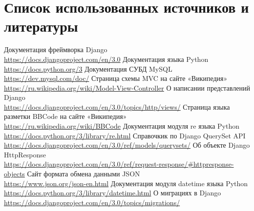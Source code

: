 \documentclass[12pt, a4paper, oneside]{article}
\begin{document}
\section{Список использованных источников и литературы}
\begingroup
\renewcommand{\section}[2]{}%
\begin{thebibliography}{10}
    \bibitem{}
    Документация фреймворка Django\\
    \url{https://docs.djangoproject.com/en/3.0}
    \bibitem{}
    Документация языка Python\\
    \url{https://docs.python.org/3}
    \bibitem{}
    Документация СУБД MySQL\\
    \url{https://dev.mysql.com/doc/}
    \bibitem{}
    Страница схемы MVC на сайте «Википедия»\\
    \url{https://ru.wikipedia.org/wiki/Model-View-Controller}
    \bibitem{}
    О написании представлений Django\\
    \url{https://docs.djangoproject.com/en/3.0/topics/http/views/}
    \bibitem{}
    Страница языка разметки BBCode на сайте «Википедия»\\
    \url{https://ru.wikipedia.org/wiki/BBCode}
    \bibitem{}
    Документация модуля re языка Python\\
    \url{https://docs.python.org/3/library/re.html}
    \bibitem{}
    Справочкик по Django QuerySet API\\
    \url{https://docs.djangoproject.com/en/3.0/ref/models/querysets/}
    \bibitem{}
    Об объекте Django HttpResponse\\
    \url{https://docs.djangoproject.com/en/3.0/ref/request-response/#httpresponse-objects}
    \bibitem{}
    Сайт формата обмена данными JSON\\
    \url{https://www.json.org/json-en.html}
    \bibitem{}
    Документация модуля datetime языка Python\\
    \url{https://docs.python.org/3/library/datetime.html}
    \bibitem{}
    О миграциях в Django\\
    \url{https://docs.djangoproject.com/en/3.0/topics/migrations/}
\end{thebibliography}
\endgroup
\end{document}
